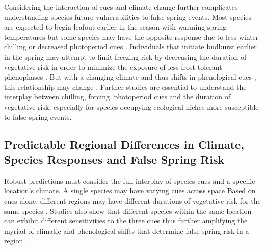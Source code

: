 \documentclass{article}\usepackage[]{graphicx}\usepackage[]{color}
\begin{document}
Considering the interaction of cues and climate change further complicates understanding species future vulnerabilities to false spring events. Most species are expected to begin leafout earlier in the season with warming spring temperatures but some species may have the opposite response due to less winter chilling or decreased photoperiod cues \citep{Cleland2006, Fu2015, Xin2016}. %
Individuals that initiate budburst earlier in the spring may attempt to limit freezing risk by decreasing the duration of vegetative risk in order to minimize the exposure of less frost tolerant phenophases \citep{Augspurger2009}. But with a changing climate and thus shifts in phenological cues%
, this relationship may change \citep{Dolezal2016}. Further studies are essential to understand the interplay between chilling, forcing, photoperiod cues and the duration of vegetative risk, especially for species occupying ecological niches more susceptible to false spring events. 

\subsection* {Predictable Regional Differences in Climate, Species Responses and False Spring Risk}
Robust predictions must consider the full interplay of species cues and a specific location's climate. A single species may have varying cues across space%
Based on cues alone, different regions may have different durations of vegetative risk for the same species \citep {Partanen2004, Viheraaarnio2006, Caffarra2011}. Studies also show that different species within the same location can exhibit different sensitivities to the three cues \citep{Basler2012, Laube2013} thus further amplifying the myriad of climatic and phenological shifts that determine false spring risk in a region. 
\end{document}
